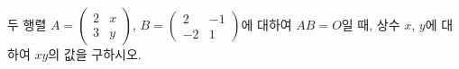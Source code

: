 두 행렬 $A=\begin{pmatrix} 2 & x \\ 3 & y \end{pmatrix}$, $B=\begin{pmatrix} 2 & -1 \\ -2 & 1 \end{pmatrix}$에 대하여 $AB=O$일 때, 상수 $x$, $y$에 대하여 $xy$의 값을 구하시오. 
